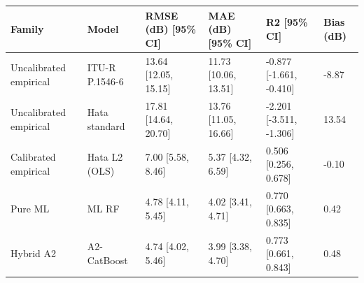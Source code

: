 \begin{tabular}{llllll}
\toprule
Family & Model & RMSE (dB) [95\% CI] & MAE (dB) [95\% CI] & R2 [95\% CI] & Bias (dB) \\
\midrule
Uncalibrated empirical & ITU-R P.1546-6 & 13.64 [12.05, 15.15] & 11.73 [10.06, 13.51] & -0.877 [-1.661, -0.410] & -8.87 \\
Uncalibrated empirical & Hata standard & 17.81 [14.64, 20.70] & 13.76 [11.05, 16.66] & -2.201 [-3.511, -1.306] & 13.54 \\
Calibrated empirical & Hata L2 (OLS) & 7.00 [5.58, 8.46] & 5.37 [4.32, 6.59] & 0.506 [0.256, 0.678] & -0.10 \\
Pure ML & ML RF & 4.78 [4.11, 5.45] & 4.02 [3.41, 4.71] & 0.770 [0.663, 0.835] & 0.42 \\
Hybrid A2 & A2-CatBoost & 4.74 [4.02, 5.46] & 3.99 [3.38, 4.70] & 0.773 [0.661, 0.843] & 0.48 \\
\bottomrule
\end{tabular}
